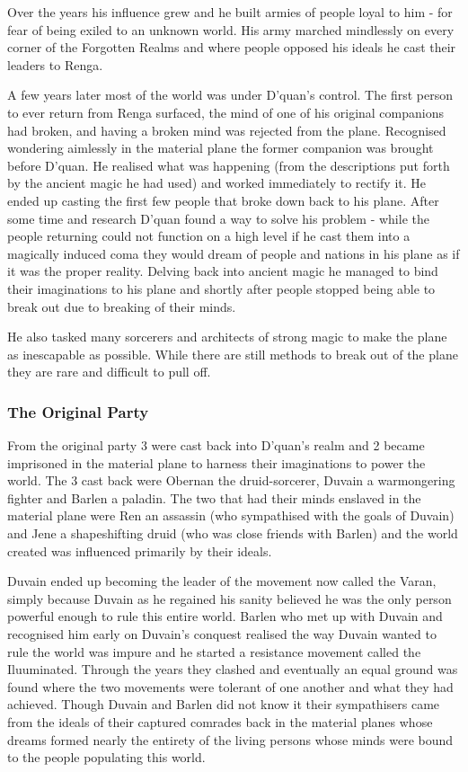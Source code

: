 \documentclass[10pt,twoside,twocolumn]{article}
\begin{document}
Over the years his influence grew and he built armies of people loyal to him - for fear of being exiled to an unknown world. His army marched mindlessly on every corner of the Forgotten Realms and where people opposed his ideals he cast their leaders to Renga.

A few years later most of the world was under D'quan's control. The first person to ever return from Renga surfaced, the mind of one of his original companions had broken, and having a broken mind was rejected from the plane. Recognised wondering aimlessly in the material plane the former companion was brought before D'quan. He realised what was happening (from the descriptions put forth by the ancient magic he had used) and worked immediately to rectify it. He ended up casting the first few people that broke down back to his plane. After some time and research D'quan found a way to solve his problem - while the people returning could not function on a high level if he cast them into a magically induced coma they would dream of people and nations in his plane as if it was the proper reality. Delving back into ancient magic he managed to bind their imaginations to his plane and shortly after people stopped being able to break out due to breaking of their minds.

He also tasked many sorcerers and architects of strong magic to make the plane as inescapable as possible. While there are still methods to break out of the plane they are rare and difficult to pull off.

\subsubsection{The Original Party}
From the original party 3 were cast back into D'quan's realm and 2 became imprisoned in the material plane to harness their imaginations to power the world. The 3 cast back were Obernan the druid-sorcerer, Duvain a warmongering fighter and Barlen a paladin. The two that had their minds enslaved in the material plane were Ren an assassin (who sympathised with the goals of Duvain) and Jene a shapeshifting druid (who was close friends with Barlen) and the world created was influenced primarily by their ideals.

Duvain ended up becoming the leader of the movement now called the Varan, simply because Duvain as he regained his sanity believed he was the only person powerful enough to rule this entire world. Barlen who met up with Duvain and recognised him early on Duvain's conquest realised the way Duvain wanted to rule the world was impure and he started a resistance movement called the Iluuminated. Through the years they clashed and eventually an equal ground was found where the two movements were tolerant of one another and what they had achieved. Though Duvain and Barlen did not know it their sympathisers came from the ideals of their captured comrades back in the material planes whose dreams formed nearly the entirety of the living persons whose minds were bound to the people populating this world.
\end{document}
